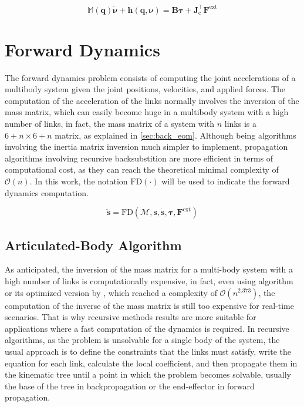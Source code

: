 \begin{equation}
    \label{eqn:equation_of_motion}
    \mathbb{M}(\mathbf{q}) \mathbf{\dot{\boldsymbol{\nu}}} + \mathbf{h} (\mathbf{q}, \boldsymbol{\nu}) = \mathbf{B}\boldsymbol{\tau} + \mathbf{J}^\top _\text{c} \mathbf{F} ^\text{ext}
\end{equation}


\section{Forward Dynamics}
\label{sec:back_fd}

The forward dynamics problem consists of computing the joint accelerations of a multibody system given the joint positions, velocities, and applied forces. The computation of the acceleration of the links normally involves the inversion of the mass matrix, which can easily become huge in a multibody system with a high number of links, in fact, the mass matrix of a system with $n$ links is a $6+n \times 6+n$ matrix, as explained in \cref{sec:back_eom}. Although being algorithms involving the inertia matrix inversion much simpler to implement, propagation algorithms involving recursive backsubstition are more efficient in terms of computational cost, as they can reach the theoretical minimal complexity of $\mathcal{O}(n)$. In this work, the notation $\mathrm{FD}(\cdot)$ will be used to indicate the forward dynamics computation.

\begin{equation}
    \ddot{\mathbf{s}} = \mathrm{FD} (\mathcal{M}, \mathbf{s}, \dot{\mathbf{s}}, \boldsymbol{\tau}, \mathbf{F} ^{\text{ext}})
\end{equation}

\subsection{Articulated-Body Algorithm}
\label{subsec:back_aba}

As anticipated, the inversion of the mass matrix for a multi-body system with a high number of links is computationally expensive, in fact, even using \citet{coppersmith_matrix_1990} algorithm or its optimized version by \citet{vassilevska-williams2012breaking}, which reached a complexity of $\mathcal{O}(n^{2.373})$, the computation of the inverse of the mass matrix is still too expensive for real-time scenarios. That is why recursive methods results are more suitable for applications where a fast computation of the dynamics is required. In recursive algorithms, as the problem is unsolvable for a single body of the system, the usual approach is to define the constraints that the links must satisfy, write the equation for each link, calculate the local coefficient, and then propagate them in the kinematic tree until a point in which the problem becomes solvable, usually the base of the tree in backpropagation or the end-effector in forward propagation.

